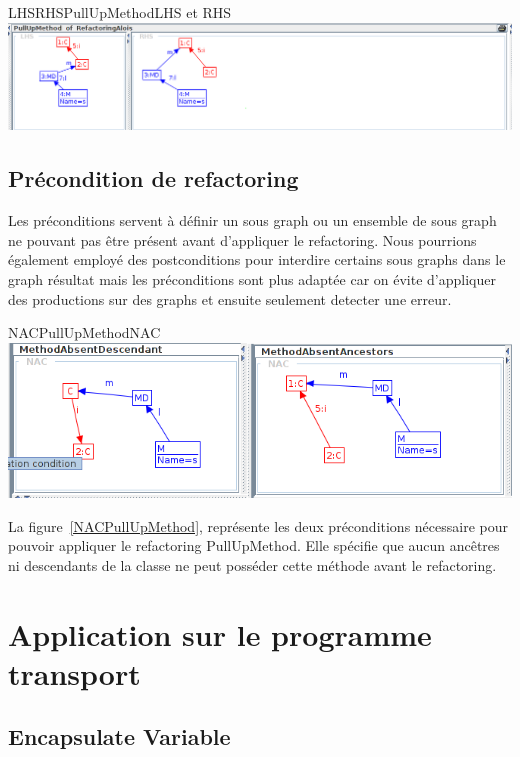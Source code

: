 \documentclass[a4paper, 12pt]{article}
\begin{document}
\begin{myfig}{LHSRHSPullUpMethod}{LHS et RHS}
\includegraphics[width=\textwidth]{LHSRHSPullUpMethod.png}
\end{myfig}

\subsection{Précondition de refactoring}
Les préconditions servent à définir un sous graph ou un ensemble de sous graph ne pouvant pas être présent avant d'appliquer le refactoring. Nous pourrions également employé des postconditions pour interdire
certains sous graphs dans le graph résultat mais les préconditions sont plus adaptée car on évite d'appliquer des productions sur des graphs et ensuite seulement detecter une erreur.

\begin{myfig}{NACPullUpMethod}{NAC}
\includegraphics[width=\textwidth]{NACPullUpMethod.png}
\end{myfig}

La figure~\ref{NACPullUpMethod}, représente les deux préconditions nécessaire pour pouvoir appliquer le refactoring PullUpMethod.
Elle spécifie que aucun ancêtres ni descendants de la classe ne peut posséder cette méthode avant le refactoring.


\section{Application sur le programme transport}

\subsection{Encapsulate Variable}
\end{document}
